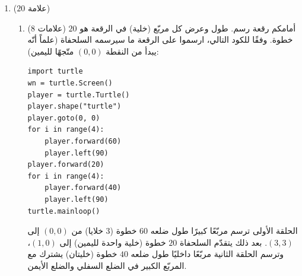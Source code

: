 \documentclass[14pt]{extarticle}
\begin{document}
\begin{enumerate}[resume, label=\textbf{السؤال \arabic*:}, wide=0pt, itemsep=2.2em]
\begin{enumerate}[label=\alph*.]
\ifwithsols
\begin{boxSolution}
الإجابة الصحيحة هي \textbf{$3$}: يحسب ويطبع باقي القسمة (المودولو) من قسمة \textenglish{num1} على \textenglish{num2} عن طريق الطرح المتكرّر لـ \textenglish{num2} من \textenglish{num1} طالما أنّ $\text{num1} \geq \text{num2}$.
\end{boxSolution}
\fi
\filbreak
\end{enumerate}
\filbreak

\item ($20$ علامة)
\begin{enumerate}[label=\alph*.]
\item ($8$ علامات) أمامكم رقعة رسم. طول وعرض كل مربّع (خلية) في الرقعة هو $20$ خطوة. وفقًا للكود التالي، ارسموا على الرقعة ما سيرسمه السلحفاة (علماً أنّه يبدأ من النقطة $(0,0)$ متّجهًا لليمين):

\begin{boxCode}
\begin{english}
\begin{verbatim}
import turtle
wn = turtle.Screen()
player = turtle.Turtle()
player.shape("turtle")
player.goto(0, 0)
for i in range(4):
    player.forward(60)
    player.left(90)
player.forward(20)
for i in range(4):
    player.forward(40)
    player.left(90)
turtle.mainloop()
\end{verbatim}
\end{english}
\end{boxCode}

\begin{center}
\begin{english}
\end{english}
\end{center}

\ifwithsols
\begin{boxSolution}
الحلقة الأولى ترسم مربّعًا كبيرًا طول ضلعه $60$ خطوة ($3$ خلايا) من $(0,0)$ إلى $(3,3)$. بعد ذلك يتقدّم السلحفاة $20$ خطوة (خلية واحدة لليمين) إلى $(1,0)$، وترسم الحلقة الثانية مربّعًا داخليًا طول ضلعه $40$ خطوة (خليتان) يشترك مع المربّع الكبير في الضلع السفلي والضلع الأيمن.
\end{boxSolution}
\fi
\filbreak


\end{enumerate}
\end{enumerate}
\end{document}
